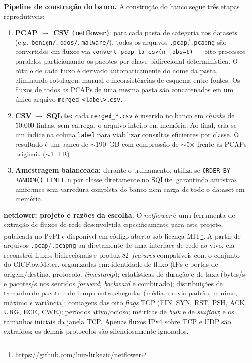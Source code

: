 \documentclass[12pt]{article}
\begin{document}
\textbf{Pipeline de construção do banco.} A construção do banco segue três
etapas reprodutíveis:

\begin{enumerate}
  \item \textbf{PCAP $\rightarrow$ CSV (netflower):} para cada pasta de categoria
    nos datasets (e.g.\ \texttt{benign/}, \texttt{ddos/}, \texttt{malware/}),
    todos os arquivos \texttt{.pcap}/\texttt{.pcapng} são convertidos em fluxos
    via \texttt{convert\_pcap\_to\_csv(n\_jobs=8)} — oito processos paralelos
    particionando os pacotes por chave bidirecional determinística. O rótulo de
    cada fluxo é derivado automaticamente do nome da pasta, eliminando rotulagem
    manual e inconsistências de esquema entre fontes. Os fluxos de todos os
    PCAPs de uma mesma pasta são concatenados em um único arquivo
    \texttt{merged\_<label>.csv}.
  \item \textbf{CSV $\rightarrow$ SQLite:} cada \texttt{merged\_*.csv} é
    inserido no banco em \textit{chunks} de 50.000 linhas, sem carregar o arquivo
    inteiro em memória. Ao final, cria-se um índice na coluna \texttt{label}
    para viabilizar consultas eficientes por classe. O resultado é um banco de
    $\sim$190~GB com compressão de $\sim$5$\times$ frente às PCAPs originais
    ($\sim$1~TB).
  \item \textbf{Amostragem balanceada:} durante o treinamento, utiliza-se
    \texttt{ORDER BY RANDOM() LIMIT n} por classe diretamente no SQLite,
    garantindo amostras uniformes sem varredura completa do banco nem carga de
    todo o dataset em memória.
\end{enumerate}

\textbf{netflower: projeto e razões da escolha.} O \textit{netflower} é uma
ferramenta de extração de fluxos de rede desenvolvida especificamente para este
projeto, publicada no PyPI e disponível em código aberto sob licença
MIT\footnote{\url{https://github.com/luiz-linkezio/netflower}}. A partir de
arquivos \texttt{.pcap}/\texttt{.pcapng} ou diretamente de uma interface de rede
ao vivo, ela reconstrói fluxos bidirecionais e produz 82~\textit{features}
compatíveis com o conjunto do CICFlowMeter, organizadas em: identidade de fluxo
(IPs e portas de origem/destino, protocolo, \textit{timestamp}); estatísticas de
duração e de taxa (bytes/s e pacotes/s nos sentidos \textit{forward},
\textit{backward} e combinado); distribuições de tamanho de pacote e de tempo
entre chegadas (média, desvio-padrão, mínimo, máximo e variância); contagens das
oito \textit{flags} TCP (FIN, SYN, RST, PSH, ACK, URG, ECE, CWR); períodos
ativo/ocioso; métricas de \textit{bulk} e de \textit{subflow}; e os tamanhos
iniciais da janela TCP. Apenas fluxos IPv4 sobre TCP e UDP são extraídos; os
demais protocolos são silenciosamente ignorados.
\end{document}
